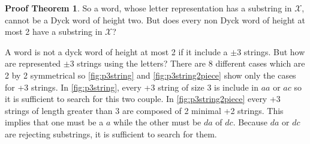 \documentclass[11pt,a4paper]{article}
\theoremstyle{definition}
\theoremstyle{plain}
\theoremstyle{definition}
\newtheorem{tproof}{Proof Theorem}[section]
\begin{document}
\begin{tproof}
    So a word, whose letter representation has a substring in $\mathcal{X}$,
    cannot be a Dyck word of height two. But does every non Dyck word of height
    at most 2 have a substring in $\mathcal{X}$?

    A word is not a dyck word of height at most 2 if it include a $\pm 3$ strings.
    But how are represented $\pm 3$ strings using the letters? There are 8
    different cases which are 2 by 2 symmetrical so \autoref{fig:p3string}
    and \autoref{fig:p3string2piece} show only the cases for +3 strings. In
    \autoref{fig:p3string}, every +3 string of size 3 is include in $aa$ or
    $ac$ so it is sufficient to search for this two couple. In \autoref{fig:p3string2piece}
    every +3 strings of length greater than 3 are composed of 2 minimal +2
    strings. This implies that one must be a $a$ while the other must be $da$
    of $dc$. Because $da$ or $dc$ are rejecting substrings, it is sufficient
    to search for them.

    \begin{figure}[h!]
        \begin{minipage}{.35\textwidth}
            \centering
\end{minipage}
\end{figure}
\end{tproof}
\end{document}
